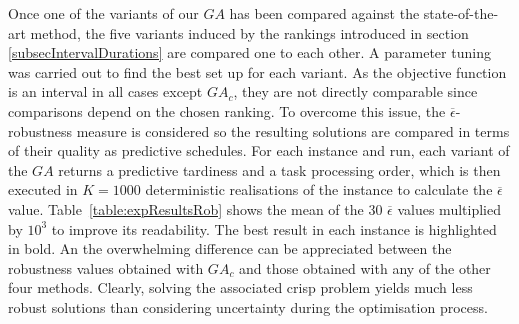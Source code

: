 \documentclass[12pt,halfline,a4paper]{ouparticle}
\begin{document}
\begin{table}[htb]
\small
\centering
\caption{Computational results and times of GA-L and $GA_{MP}$}

\setlength{\tabcolsep}{1.5mm}%
\label{table:expResultsEV}
\end{table}

Once one of the variants of our $GA$ has been compared against the state-of-the-art method, the five variants induced by the rankings introduced in section \ref{subsecIntervalDurations} are compared one to each other. A parameter tuning was carried out to find the best set up for each variant. As the objective function is an interval in all cases except $GA_c$, they are not directly comparable since comparisons depend on the chosen ranking. To overcome this issue,  the $\overline{\epsilon}$-robustness measure is considered so the resulting solutions are compared in terms of their quality as predictive schedules. For each instance and run, each variant of the $GA$ returns a predictive tardiness and a task processing order, which is then executed in $K=1000$ deterministic realisations of the instance to calculate the $\overline{\epsilon}$ value. Table~\ref{table:expResultsRob} shows the mean of the 30 $\overline{\epsilon}$ values multiplied by $10^3$ to improve its readability. The best result in each instance is highlighted in bold.  An the overwhelming difference can be appreciated between the robustness values obtained with $GA_{c}$ and those obtained with any of the other four methods. Clearly, solving the associated crisp problem yields much less robust solutions than considering uncertainty during the optimisation process.
\end{document}
